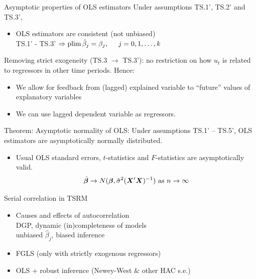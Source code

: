 \documentclass{beamer}
\begin{document}
\begin{frame}{Asymptotic properties of OLS estimators}
Under assumptions TS.1', TS.2' and TS.3', \\ \medskip
\begin{itemize}
\item OLS estimators are consistent (not unbiased)\\ 
\medskip
TS.1' - TS.3' $\Rightarrow \textnormal{plim}\,\hat{\beta}_j = \beta_j, \hspace{0.5cm} j=0, 1, \dots, k$
\end{itemize} \bigskip
Removing strict exogeneity (TS.3 $\rightarrow$ TS.3'): no restriction on how $u_t$ is related to regressors in other time periods. Hence: \\
\medskip
\begin{itemize}
\item We allow for feedback from (lagged) explained variable to ``future'' values of explanatory variables 
\medskip
\item We can use lagged dependent variable as regressors.
\end{itemize} \medskip
Theorem: Asymptotic normality of OLS: Under assumptions TS.1' – TS.5', OLS estimators are asymptotically normally distributed. \medskip
\begin{itemize}
\item Usual OLS standard errors, $t$-statistics and $F$-statistics are asymptotically valid.
$$
\hat{\bm{\beta}} \rightarrow N(\bm{\beta}, \hat{\sigma}^2(\bm{X}^{\prime} \bm{X})^{-1} )
\textnormal{~as~} n \rightarrow \infty
$$
\end{itemize}
\end{frame}
\begin{frame}{Serial correlation in TSRM}
\begin{itemize}
\item Causes and effects of autocorrelation \\ \bigskip DGP, dynamic (in)completeness of models\\ \medskip unbiased $\hat{\beta}_j$, biased inference
\bigskip
\bigskip
\item FGLS (only with strictly exogenous regressors)
\bigskip
\item OLS + robust inference (Newey-West \& other HAC s.e.)
\end{itemize}
\end{frame}
\end{document}
